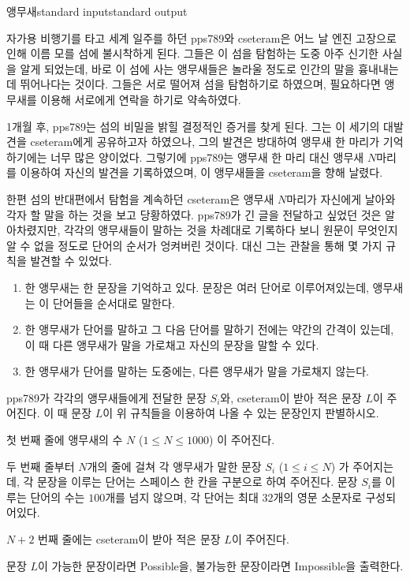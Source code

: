 \begin{problem}{앵무새}{standard input}{standard output}

자가용 비행기를 타고 세계 일주를 하던 pps789와 cseteram은 어느 날 엔진 고장으로 인해 이름 모를 섬에 불시착하게 된다. 그들은 이 섬을 탐험하는 도중 아주 신기한 사실을 알게 되었는데, 바로 이 섬에 사는 앵무새들은 놀라울 정도로 인간의 말을 흉내내는 데 뛰어나다는 것이다. 그들은 서로 떨어져 섬을 탐험하기로 하였으며, 필요하다면 앵무새를 이용해 서로에게 연락을 하기로 약속하였다.

1개월 후, pps789는 섬의 비밀을 밝힐 결정적인 증거를 찾게 된다. 그는 이 세기의 대발견을 cseteram에게 공유하고자 하였으나, 그의 발견은 방대하여 앵무새 한 마리가 기억하기에는 너무 많은 양이었다. 그렇기에 pps789는 앵무새 한 마리 대신 앵무새 $N$마리를 이용하여 자신의 발견을 기록하였으며, 이 앵무새들을 cseteram을 향해 날렸다.

한편 섬의 반대편에서 탐험을 계속하던 cseteram은 앵무새 $N$마리가 자신에게 날아와 각자 할 말을 하는 것을 보고 당황하였다. pps789가 긴 글을 전달하고 싶었던 것은 알아차렸지만, 각각의 앵무새들이 말하는 것을 차례대로 기록하다 보니 원문이 무엇인지 알 수 없을 정도로 단어의 순서가 엉켜버린 것이다. 대신 그는 관찰을 통해 몇 가지 규칙을 발견할 수 있었다.

\begin{enumerate}
\item{한 앵무새는 한 문장을 기억하고 있다. 문장은 여러 단어로 이루어져있는데, 앵무새는 이 단어들을 순서대로 말한다.}
\item{한 앵무새가 단어를 말하고 그 다음 단어를 말하기 전에는 약간의 간격이 있는데, 이 때 다른 앵무새가 말을 가로채고 자신의 문장을 말할 수 있다.}
\item{한 앵무새가 단어를 말하는 도중에는, 다른 앵무새가 말을 가로채지 않는다.}
\end{enumerate}

pps789가 각각의 앵무새들에게 전달한 문장 $S_i$와, cseteram이 받아 적은 문장 $L$이 주어진다. 이 때 문장 $L$이 위 규칙들을 이용하여 나올 수 있는 문장인지 판별하시오.

\InputFile
첫 번째 줄에 앵무새의 수 $N$ ($1 \le N \le 1000$) 이 주어진다.

두 번째 줄부터 $N$개의 줄에 걸쳐 각 앵무새가 말한 문장 $S_i$ ($1 \le i \le N$) 가 주어지는데, 각 문장을 이루는 단어는 스페이스 한 칸을 구분으로 하여 주어진다. 문장 $S_i$를 이루는 단어의 수는 $100$개를 넘지 않으며, 각 단어는 최대 $32$개의 영문 소문자로 구성되어있다.

$N+2$ 번째 줄에는 cseteram이 받아 적은 문장 $L$이 주어진다.

\OutputFile
문장 $L$이 가능한 문장이라면 Possible을, 불가능한 문장이라면 Impossible을 출력한다.

\Example

\begin{example}
%
%
%
\end{example}

\end{problem}
